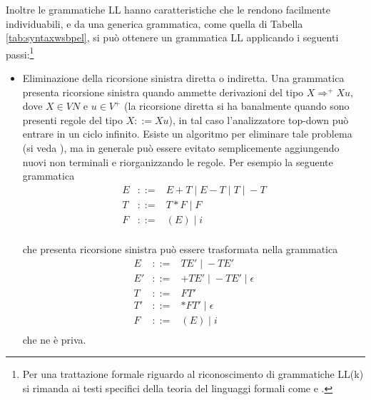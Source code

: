 Inoltre le grammatiche LL hanno caratteristiche che le rendono facilmente
individuabili, e da una generica grammatica, come quella di
Tabella \ref{tab:syntaxwsbpel}, si può ottenere un grammatica LL applicando i seguenti
passi:\footnote{Per una trattazione formale riguardo al riconoscimento di
grammatiche LL(k) si rimanda ai testi specifici della teoria del linguaggi
formali come \cite{Bruno} e \cite{DragonBook}.} 
\begin{itemize}
  \item Eliminazione della ricorsione sinistra diretta o indiretta. Una
  grammatica presenta ricorsione sinistra quando ammette derivazioni del tipo
 $X \Rightarrow^+ Xu$, dove $X \in VN$ e $u \in V^+$ (la ricorsione diretta si
 ha banalmente quando sono presenti regole del tipo $X ::= Xu$), in tal caso
 l'analizzatore top-down può entrare in un ciclo infinito. Esiste un algoritmo
 per eliminare tale problema (si veda \cite{Bruno}), ma in generale può
 essere evitato semplicemente aggiungendo nuovi non terminali e riorganizzando
 le regole. Per esempio la seguente grammatica 
 $$
 \begin{array}{rcl} 
  E & ::= & E + T \; | \; E - T \; |\; T \;|\; -T \\
  T & ::= & T * F \; | \; F \\
  F & ::= & (E) \; | \; i \\
 \end{array}
 $$
 
 che presenta ricorsione sinistra può essere trasformata nella grammatica
 $$
 \begin{array}{rcl} 
  E  & ::= & TE' \; | \; - TE' \\
  E' & ::= & +TE' \; | \; - TE' \; | \; \epsilon \\
  T  & ::= &  FT' \\
  T' & ::= & *FT' \; | \; \epsilon \\
  F & ::= & (E) \; | \; i \\
 \end{array}
 $$
 che ne è priva.
 

\end{itemize}
